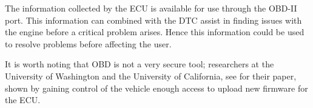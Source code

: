 The information collected by the \ac{ECU} is available for use through the \ac{OBD}-II port.
This information can combined with the \ac{DTC} assist in finding issues with the engine before a critical problem arises.
Hence this information could be used to resolve problems before affecting the user.

\bigskip \noindent
It is worth noting that \ac{OBD} is not a very secure tool; researchers at the University of Washington and the University of California, see \cite{OBDSecurity} for their paper, shown by gaining control of the vehicle enough access to upload new firmware for the \ac{ECU}.
